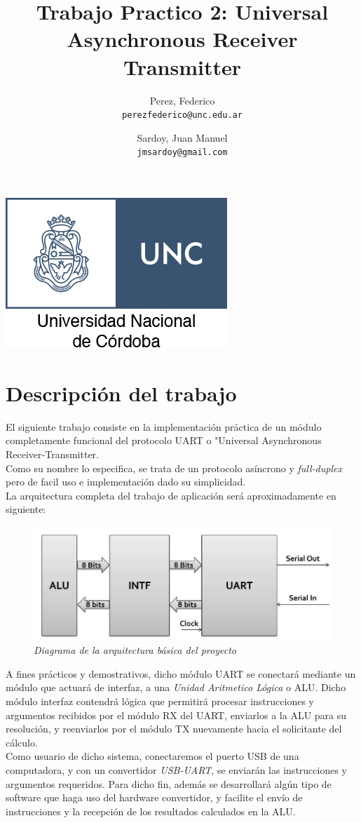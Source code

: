 \documentclass{article}
\title{Trabajo Practico 2: Universal Asynchronous Receiver Transmitter}
\author{Perez, Federico\\
        \texttt{perezfederico@unc.edu.ar}
        \and 
        Sardoy, Juan Manuel\\
        \texttt{jmsardoy@gmail.com}
        }
\begin{document}
\maketitle	
\begin{center}
    \includegraphics[scale=2]{unc-logo}
\end{center}
\newpage
\section{Descripción del trabajo}

El siguiente trabajo consiste en la implementación práctica de un módulo completamente
funcional del protocolo UART o "Universal Asynchronous Receiver-Transmitter. \\
Como su nombre lo especifica, se trata de un protocolo asíncrono y \textit{full-duplex}
pero de facil uso e implementación dado su simplicidad.\\
La arquitectura completa del trabajo de aplicación será aproximadamente en siguiente:

\begin{figure}[H]
    \includegraphics[scale=0.5]{arch}
    \caption{\textit{Diagrama de la arquitectura básica del proyecto}}
\end{figure}

\indent A fines prácticos y demostrativos, dicho módulo UART se conectará mediante un 
módulo que actuará de interfaz, a una \textit{Unidad Aritmetico Lógica} o ALU.
Dicho módulo interfaz contendrá lógica que permitirá procesar instrucciones y argumentos recibidos
por el módulo RX del UART, enviarlos a la ALU para su resolución, y reenviarlos por el módulo TX 
nuevamente hacia el solicitante del cálculo. \\
\indent Como usuario de dicho sistema, conectaremos el puerto USB de una computadora, y con un convertidor
\textit{USB-UART}, se enviarán las instrucciones y argumentos requeridos. Para dicho fin, además se 
desarrollará algún tipo de software que haga uso del hardware convertidor, y facilite el envío de instrucciones
y la recepción de los resultados calculados en la ALU.\\ 
\end{document}
